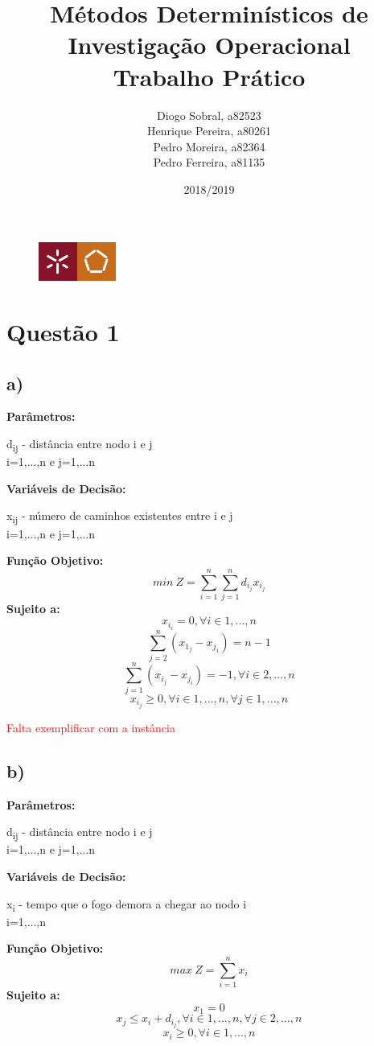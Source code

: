 \documentclass[11pt]{article} %
\title{Métodos Determinísticos de Investigação Operacional \\ \large Trabalho Prático}
\author{Diogo Sobral, a82523 \\ Henrique Pereira, a80261 \\ Pedro Moreira, a82364 \\ Pedro Ferreira, a81135}
\date{2018/2019}
\begin{document}
\maketitle

\begin{figure}[!b]
    \centering
    \includegraphics[width=1in]{um_eeng.jpg}
\end{figure}

\newpage

\section*{Questão 1}
\subsection*{a)}
\textbf{Parâmetros:}  \\
\begin{center}
d\textsubscript{ij} - distância entre nodo i e j \\
i=1,...,n e j=1,...n \\
\end{center}
\textbf{Variáveis de Decisão:} \\
\begin{center}
x\textsubscript{ij} - número de caminhos existentes entre i e j \\
i=1,...,n e j=1,...n \\
\end{center}
\textbf{Função Objetivo:} \\
$$min \ Z = \sum_{i=1}^{n} \sum_{j=1}^{n} d_i_jx_i_j$$
\textbf{Sujeito a:}
$$x_i_i = 0, \forall i \in 1,...,n$$
$$\sum_{j=2}^{n} (x_1_j - x_j_1) = n-1$$
$$\sum_{j=1}^{n} (x_i_j - x_j_i) = -1, \forall i \in 2,...,n $$
$$x_i_j \geq 0, \forall i \in 1,...,n , \forall j \in 1,...,n$$

\textcolor{red}{Falta exemplificar com a instância}

\subsection*{b)}

\textbf{Parâmetros:}  \\
\begin{center}
d\textsubscript{ij} - distância entre nodo i e j \\
i=1,...,n e j=1,...n \\
\end{center}
\textbf{Variáveis de Decisão:} \\
\begin{center}
x\textsubscript{i} - tempo que o fogo demora a chegar ao nodo i \\
i=1,...,n\\
\end{center}
\textbf{Função Objetivo:} \\
$$max \ Z = \sum_{i=1}^{n} x_i$$
\textbf{Sujeito a:}
$$x_1 = 0$$
$$x_j \leq x_i + d_i_j, \forall i \in 1,...,n , \forall j \in 2,...,n$$
$$x_i \geq 0, \forall i \in 1,...,n$$
\end{document}

